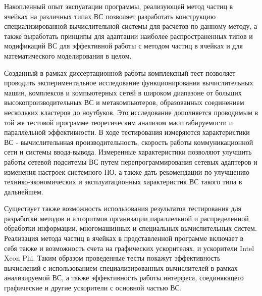 {\influence} Накопленный опыт экспуатации программы, реализующей метод частиц в ячейках на различных типах ВС позволяет разработать конструкцию специализированной вычислительной системы для расчетов по данному методу, а также выработать принципы для адаптации наиболее распространенных типов и модификаций ВС для эффективной работы с методом частиц в ячейках и для математического моделирования в целом.

Созданный в рамках диссертационной работы комплексный тест позволяет проводить экспериментальное исследование функционирования вычислительных машин, комплексов и компьютерных сетей в широком диапазоне от больших высокопроизводительных ВС и метакомпьютеров, образованных соединением нескольких кластеров до ноутбуков. Это исследование дополняется проводимым в той же тестовой программе теоретическим анализом масштабируемости и параллельной эффективности. В ходе тестирования измеряются характеристики ВС - вычислительнная производительность, скорость работы коммуникационной сети и системы ввода-вывода. Измеренные характеристики позволяют улучшить работы сетевой подситемы ВС путем перепрограммирования сетевых адаптеров и изменения настроек системного ПО, а также дать рекомендации по улучшению технико-экономических и эксплуатационных характеристик ВС такого типа в дальнейшем.


Существует также возможность использования результатов тестирования для разработки методов и алгоритмов организации параллельной и распределенной обработки информации, многомашинных и специальных вычислительных систем. Реализация
метода частиц в ячейках в представленной программе включает в себя также и возможность счета на графических ускорителях, и ускорители Intel Xeon Phi. Таким образом проведенные тесты покажут эффективность вычислений с использованием специализированных вычислителей в рамках анализируемой ВС, а также эффективность работы интерфеса, соединяющего графические и другие ускорители с основной частью ВС.

